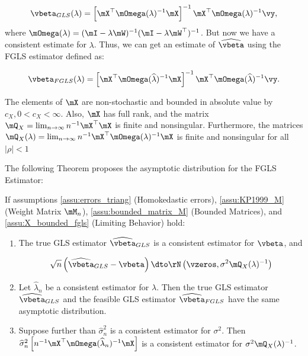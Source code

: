 \documentclass[english,12pt]{book}\usepackage[]{graphicx}\usepackage[]{xcolor}
\begin{document}
\begin{equation}\label{eq:beta_gls_gm}
\vbeta_{GLS}(\lambda) =\left[\mX^\top\mOmega(\lambda)^{-1}\mX\right]^{-1}\mX^\top\mOmega(\lambda)^{-1}\vy,
\end{equation}
%
where $\mOmega(\lambda) = (\mI - \lambda\mW)^{-1}(\mI - \lambda\mW^\top)^{-1}$. But now we have a consistent estimate for $\lambda$. Thus, we can get an estimate of $\widehat{\vbeta}$ using the FGLS estimator defined as:

\begin{equation}\label{eq:beta_fgls}
\vbeta_{FGLS}(\lambda) =\left[\mX^\top\mOmega(\widehat{\lambda})^{-1}\mX\right]^{-1}\mX^\top\mOmega(\widehat{\lambda})^{-1}\vy.
\end{equation}


\begin{assumption}\label{assu:X_bounded_fgls}
  The elements of $\mX$ are non-stochastic and bounded in absolute value by $c_X, 0 < c_X < \infty$. Also, $\mX$ has full rank, and the matrix $\mQ_X = \lim_{n\to\infty}n^{-1}\mX^\top\mX$ is finite and nonsingular. Furthermore, the matrices $\mQ_X(\lambda) = \lim_{n\to \infty} n^{-1}\mX^\top\mOmega(\lambda)^{-1}\mX$ is finite and nonsingular for all $\left|\rho\right| < 1$
\end{assumption}

The following Theorem proposes the asymptotic distribution for the FGLS Estimator:

\begin{theorem}\label{teo:Asymptotic-FGLS}
  If assumptions \ref{assu:errors_triang} (Homokedastic errors), \ref{assu:KP1999_M} (Weight Matrix $\mM_n$), \ref{assu:bounded_matrix_M} (Bounded Matrices), and \ref{assu:X_bounded_fgls} (Limiting Behavior) hold: 
  \begin{enumerate}
    \item The true GLS estimator $\widehat{\vbeta}_{GLS}$ is a consistent estimator for $\vbeta$, and
    
    \begin{equation}
      \sqrt{n}\left(\widehat{\vbeta}_{GLS} - \vbeta\right)\dto \rN\left(\vzeros, \sigma^2 \mQ_X(\lambda)^{-1}\right)
    \end{equation}
    
    \item Let $\widehat{\lambda}_n$ be a consistent estimator for $\lambda$. Then the true GLS estimator $\widehat{\vbeta}_{GLS}$ and the feasible GLS estimator $\widehat{\vbeta}_{FGLS}$ have the same asymptotic distribution.
    \item Suppose further than $\widehat{\sigma}^2_n$ is a consistent estimator for $\sigma^2$. Then $\widehat{\sigma}^2_n\left[n^{-1}\mX^\top\mOmega(\widehat{\lambda}_n)^{-1}\mX\right]$ is a consistent estimator for $\sigma^2 \mQ_X(\lambda)^{-1}$.
  \end{enumerate}
\end{theorem}
\end{document}
